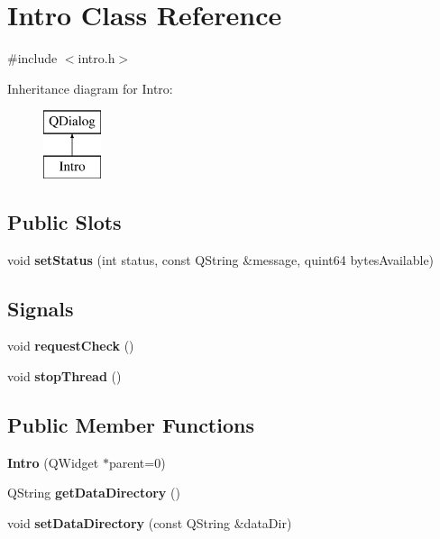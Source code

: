 \hypertarget{class_intro}{}\section{Intro Class Reference}
\label{class_intro}


{\ttfamily \#include $<$intro.\+h$>$}

Inheritance diagram for Intro\+:\begin{figure}[H]
\begin{center}
\leavevmode
\includegraphics[height=2.000000cm]{class_intro}
\end{center}
\end{figure}
\subsection*{Public Slots}
\begin{DoxyCompactItemize}
\item 
\mbox{\label{class_intro_a07d9b3b639deb51f1c7b1a9cedf09840}} 
void {\bfseries set\+Status} (int status, const Q\+String \&message, quint64 bytes\+Available)
\end{DoxyCompactItemize}
\subsection*{Signals}
\begin{DoxyCompactItemize}
\item 
\mbox{\label{class_intro_ac749e739adfe5830ffd7c62b72580adb}} 
void {\bfseries request\+Check} ()
\item 
\mbox{\label{class_intro_a062971eb5d928316b3d59b771d3b0397}} 
void {\bfseries stop\+Thread} ()
\end{DoxyCompactItemize}
\subsection*{Public Member Functions}
\begin{DoxyCompactItemize}
\item 
\mbox{\label{class_intro_a82415c2693757f51e4e93ccc8abd720e}} 
{\bfseries Intro} (Q\+Widget $\ast$parent=0)
\item 
\mbox{\label{class_intro_adb031cec261524a5ef561eb75f099f90}} 
Q\+String {\bfseries get\+Data\+Directory} ()
\item 
\mbox{\label{class_intro_a2f11c0fccc56ec7bb53cfddec98ee21b}} 
void {\bfseries set\+Data\+Directory} (const Q\+String \&data\+Dir)
\end{DoxyCompactItemize}

